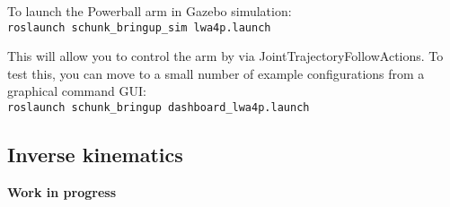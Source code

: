 To launch the Powerball arm in Gazebo simulation:\\
\texttt{roslaunch schunk\_bringup\_sim lwa4p.launch}

This will allow you to control the arm by via JointTrajectoryFollowActions. To test this, you can move to a small number of example configurations from a graphical command GUI:\\
\texttt{roslaunch schunk\_bringup dashboard\_lwa4p.launch}

\subsection{Inverse kinematics}

{\bf Work in progress}
